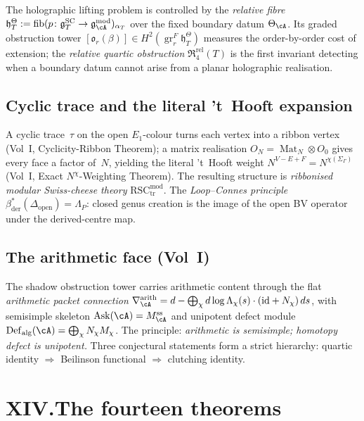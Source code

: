 The holographic lifting problem is controlled by the
\emph{relative fibre}
$\mathfrak{h}_T^\Theta :=
\operatorname{fib}(p\colon\gSC_T\to\gAmod)_{\alpha_T}$
over the fixed boundary datum $\Theta_\cA$. Its graded
obstruction tower
$[\mathfrak{o}_r(\beta)] \in
H^2(\operatorname{gr}^F_r\mathfrak{h}_T^\Theta)$
measures the order-by-order cost of extension; the
\emph{relative quartic obstruction}
$\mathfrak{R}_4^{\mathrm{rel}}(T)$ is the first invariant
detecting when a boundary datum cannot arise from a
planar holographic realisation.

\subsection*{Cyclic trace and the literal 't~Hooft
expansion}

A cyclic trace~$\tau$ on the open $E_1$-colour turns
each vertex into a ribbon vertex (Vol~I, Cyclicity-Ribbon
Theorem); a matrix realisation
$O_N = \operatorname{Mat}_N \otimes O_0$ gives every face
a factor of~$N$, yielding the literal 't~Hooft weight
$N^{V-E+F} = N^{\chi(\Sigma_\Gamma)}$ (Vol~I, Exact
$N^{\chi}$-Weighting Theorem). The resulting structure is
\emph{ribbonised modular Swiss-cheese theory}
$\mathrm{RSC}_{\mathrm{tr}}^{\mathrm{mod}}$.
The \emph{Loop--Connes principle}
$\beta_{\mathrm{der}}^*(\Delta_{\mathrm{open}}) = \Lambda_P$:
closed genus creation is the image of the open BV operator
under the derived-centre map.

\subsection*{The arithmetic face (Vol~I)}

The shadow obstruction tower carries arithmetic content through the flat
\emph{arithmetic packet connection}
$\nabla_\cA^{\mathrm{arith}} = d - \bigoplus_\chi
d\log\Lambda_\chi(s)\cdot(\mathrm{id}+N_\chi)\,ds$,
with semisimple skeleton
$\mathrm{Ask}(\cA) = M_\cA^{\mathrm{ss}}$ and
unipotent defect module
$\mathrm{Def}_{\mathrm{alg}}(\cA) = \bigoplus_\chi
N_\chi M_\chi$. The principle: \emph{arithmetic is
semisimple; homotopy defect is unipotent.}
Three conjectural statements form a strict hierarchy:
quartic identity $\Rightarrow$ Beilinson functional
$\Rightarrow$ clutching identity.

\section*{XIV.\quad The fourteen theorems}

